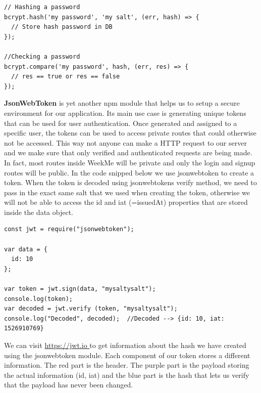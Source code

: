 \begin{lstlisting}
// Hashing a password
bcrypt.hash('my password', 'my salt', (err, hash) => {
  // Store hash password in DB
});

//Checking a password
bcrypt.compare('my password', hash, (err, res) => {
  // res == true or res == false
});
\end{lstlisting}


\textbf{JsonWebToken} is yet another npm module that helps us to setup a secure environment for our application. Its main use case is generating unique tokens that can be used for user authentication. Once generated and assigned to a specific user, the tokens can be used to access private routes that could otherwise not be accessed. This way not anyone can make a HTTP request to our server and we make sure that only verified and authenticated requests are being made. In fact, most routes inside WeekMe will be private and only the login and signup routes will be public. In the code snipped below we use jsonwebtoken to create a token. When the token is decoded using jsonwebtokens verify method, we need to pass in the exact same salt that we used when creating the token, otherwise we will not be able to access the id and iat (=issuedAt) properties that are stored inside the data object.  

\begin{lstlisting}
const jwt = require("jsonwebtoken");

var data = {
  id: 10
};

var token = jwt.sign(data, "mysaltysalt");
console.log(token);
var decoded = jwt.verify (token, "mysaltysalt");
console.log("Decoded", decoded);  //Decoded --> {id: 10, iat: 1526910769}
\end{lstlisting}

\cleardoublepage 

We can visit \url{https://jwt.io } to get information about the hash we have created using the jsonwebtoken module. Each component of our token stores a different information. The red part is the header. The purple part is the payload storing the actual information (id, iat) and the blue part is the hash that lets us verify that the payload has never been changed. 


